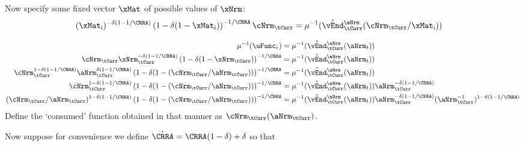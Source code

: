 \documentclass[./SolvingMicroDSOPs]{subfiles}
\begin{document}
{{      Now specify some fixed vector $\xMat$ of possible values of $\xNrm$:
      \begin{align}
        (\xMat_{\aIdx})^{-\wealthU(1-1/\CRRA)} \left(1-\wealthU(1-\xMat_{\aIdx})\right)^{-1/\CRRA} \cNrm_{\tCurr} & = \muInv(\Maxed{\vEnd}^{\aNrm}_{\tCurr}(\cNrm_{\tCurr}/\xMat_{\aIdx})) \notag
      \end{align}  
      
      \begin{align}
        \muInv(\uFunc_{c}) & = \muInv(\Maxed{\vEnd}^{\aNrm}_{\tCurr}(\aNrm_{t}))
        \\ \cNrm_{\tCurr} \xNrm_{\tCurr}^{-\wealthU(1-1/\CRRA)} \left(1-\wealthU(1-\xNrm_{\tCurr})\right)^{-1/\CRRA} & = \muInv(\Maxed{\vEnd}^{\aNrm}_{\tCurr}(\aNrm_{t})) \notag
        \\ \cNrm_{\tCurr}^{1-\wealthU(1-1/\CRRA)} \aNrm_{\tCurr}^{\wealthU(1-1/\CRRA)} \left(1-\wealthU(1-(\cNrm_{\tCurr}/\aNrm_{\tCurr}))\right)^{-1/\CRRA} & = \muInv(\Maxed{\vEnd}^{\aNrm}_{\tCurr}(\aNrm_{t})) \notag
        \\ \cNrm_{\tCurr}^{1-\wealthU(1-1/\CRRA)}  \left(1-\wealthU(1-(\cNrm_{\tCurr}/\aNrm_{\tCurr}))\right)^{-1/\CRRA} & = \muInv(\Maxed{\vEnd}^{\aNrm}_{\tCurr}(\aNrm_{t})) \aNrm_{\tCurr}^{-\wealthU(1-1/\CRRA)} \notag 
        \\ (\cNrm_{\tCurr}/\aNrm_{\tCurr})^{1-\wealthU(1-1/\CRRA)}  \left(1-\wealthU(1-(\cNrm_{\tCurr}/\aNrm_{\tCurr}))\right)^{-1/\CRRA} & = \muInv(\Maxed{\vEnd}^{\aNrm}_{\tCurr}(\aNrm_{t})) \aNrm_{\tCurr}^{-\wealthU(1-1/\CRRA)}(\aNrm_{\tCurr}^{-1})^{1-\wealthU(1-1/\CRRA)} \notag
                               \notag
      \end{align}
      Define the `consumed' function obtained in that manner as $\mathfrak{\cNrm}_{\tCurr}(\aNrm_{\tCurr})$.
    }{}
  } %
  { %
  }
  Now suppose for convenience we define $\grave{\CRRA}=\CRRA(1-\wealthU)+\wealthU$ so that
\end{document}
